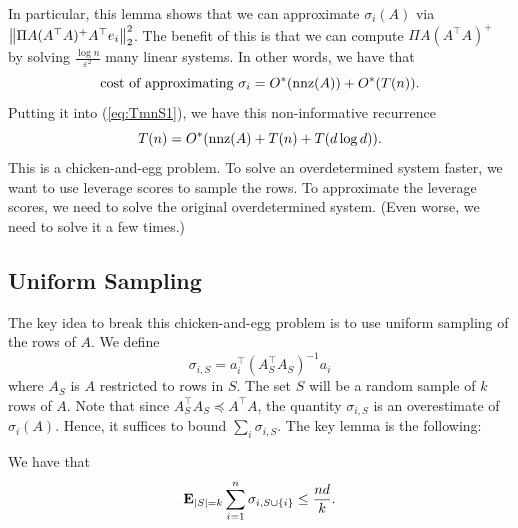 In particular, this lemma shows that we can approximate $\sigma_{i}(A)$
via $\left\Vert \Pi A(A^{\top}A)^{+}A^{\top}e_{i}\right\Vert^{2}_{2}$. The benefit
of this is that we can compute $\Pi A(A^{\top}A)^{+}$ by solving
$\frac{\log n}{\varepsilon^{2}}$ many linear systems. In other words,
we have that 
\[
\text{cost of approximating }\sigma_{i}=O^{*}(\mathrm{nnz}(A))+O^{*}(T(n)).
\]
Putting it into (\ref{eq:TmnS1}), we have this non-informative recurrence
\[
T(n)=O^{*}(\mathrm{nnz}(A)+T(n)+T(d\log d)).
\]
This is a chicken-and-egg problem. To solve an overdetermined system
faster, we want to use leverage scores to sample the rows. To approximate
the leverage scores, we need to solve the original overdetermined
system. (Even worse, we need to solve it a few times.)

\subsection{Uniform Sampling}

The key idea to break this chicken-and-egg problem is to use uniform
sampling of the rows of $A$. We define
\[
\sigma_{i,S}=a^{\top}_{i}(A^{\top}_{S}A_{S})^{-1}a_{i}
\]
where $A_{S}$ is $A$ restricted to rows in $S$. The set $S$ will
be a random sample of $k$ rows of $A$. Note that since $A^{\top}_{S}A_{S}\preceq A^{\top}A$,
the quantity $\sigma_{i,S}$ is an overestimate of $\sigma_{i}(A)$.
Hence, it suffices to bound $\sum_{i}\sigma_{i,S}$. The key lemma
is the following:
\begin{lem}
\label{lem:sigmaSi}We have that
\[
\mathbf{E}_{|S|=k}\sum^{n}_{i=1}\sigma_{i,S\cup\{i\}}\leq\frac{nd}{k}.
\]
\end{lem}

